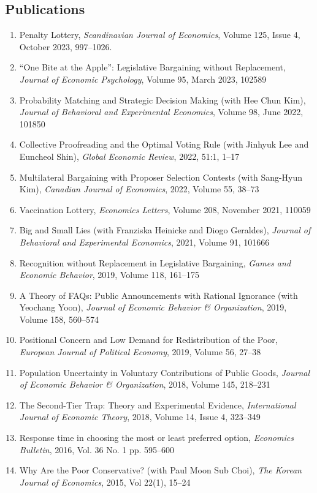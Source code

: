 \documentclass[margin, a4paper]{res}
\begin{document}
\begin{resume}
\section{Publications}
\begin{enumerate}[leftmargin=*]
\item Penalty Lottery, \emph{Scandinavian Journal of Economics}, Volume 125, Issue 4, October 2023, 997--1026.
\item ``One Bite at the Apple'': Legislative Bargaining without Replacement, \emph{Journal of Economic Psychology}, Volume 95, March 2023, 102589
\item Probability Matching and Strategic Decision Making (with Hee Chun Kim), \emph{Journal of Behavioral and Experimental Economics}, Volume 98, June 2022, 101850
\item Collective Proofreading and the Optimal Voting Rule (with Jinhyuk Lee and Euncheol Shin), \emph{Global Economic Review}, 2022, 51:1, 1--17
\item Multilateral Bargaining with Proposer Selection Contests (with Sang-Hyun Kim), \emph{Canadian Journal of Economics}, 2022, Volume 55, 38--73
\item Vaccination Lottery, \emph{Economics Letters}, Volume 208, November 2021, 110059
\item Big and Small Lies (with Franziska Heinicke and Diogo Geraldes), \emph{Journal of Behavioral and Experimental Economics}, 2021, Volume 91, 101666
\item Recognition without Replacement in Legislative Bargaining, \emph{Games and Economic Behavior}, 2019, Volume 118, 161--175
\item A Theory of FAQs: Public Announcements with Rational Ignorance (with Yeochang Yoon), \emph{Journal of Economic Behavior \& Organization}, 2019, Volume 158, 560--574
\item Positional Concern and Low Demand for Redistribution of the Poor, \emph{European Journal of Political Economy}, 2019, Volume 56, 27--38
\item Population Uncertainty in Voluntary Contributions of Public Goods, \emph{Journal of Economic Behavior \& Organization}, 2018, Volume 145, 218--231
\item The Second-Tier Trap: Theory and Experimental Evidence, \emph{International Journal of Economic Theory}, 2018, Volume 14, Issue 4, 323--349
\item Response time in choosing the most or least preferred option, \textit{Economics Bulletin}, 2016, Vol. 36 No. 1 pp. 595--600
\item Why Are the Poor Conservative? (with Paul Moon Sub Choi), \textit{The Korean Journal of Economics}, 2015, Vol 22(1), 15--24
\end{enumerate}


\end{resume}
\end{document}
